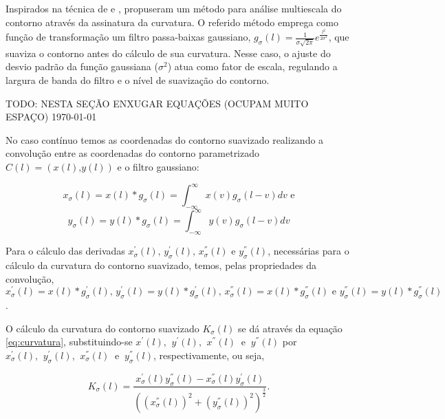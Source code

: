 Inspirados na técnica de  e ,  propuseram um método para análise multiescala do contorno através da assinatura da curvatura. O referido método emprega como função de transformação um filtro passa-baixas gaussiano, $g_{\sigma}(l) = \frac{1}{\sigma\sqrt{2\pi}}e^{\frac{l^2}{2\sigma^2}}$, que suaviza o contorno antes do cálculo de sua curvatura. Nesse caso, o ajuste do desvio padrão da função gaussiana ($\sigma^2$) atua como fator de escala, regulando a largura de banda do filtro e o nível de suavização do contorno.



\color{red}TODO: NESTA SEÇÃO ENXUGAR EQUAÇÕES (OCUPAM MUITO ESPAÇO) \today\color{black}


No caso contínuo temos as coordenadas do contorno suavizado realizando a convolução entre as coordenadas do contorno parametrizado $C(l) = (x(l)\text{,}y(l))$ e o filtro gaussiano:  

\begin{equation}
x_{\sigma}(l) = x(l) * g_{\sigma}(l) = \int^{\infty}_{-\infty}{x(v)g_{\sigma}(l-v)}dv \text{ e}
\end{equation}
\begin{equation}
y_{\sigma}(l) = y(l) * g_{\sigma}(l)=\int^{\infty}_{-\infty}{y(v)g_{\sigma}(l-v)}dv
\end{equation}

Para o cálculo das derivadas $x^{'}_{\sigma}(l)\text{, }y^{'}_{\sigma}(l)\text{, }x^{''}_{\sigma}(l) \text{ e }y^{''}_{\sigma}(l)$, necessárias para o cálculo da curvatura do contorno suavizado, temos, pelas propriedades da convolução, $x^{'}_{\sigma}(l) = x(l) * g^{'}_{\sigma}(l)\text{, }y^{'}_{\sigma}(l) = y(l) * g^{'}_{\sigma}(l)\text{, }x^{''}_{\sigma}(l) = x(l) * g^{''}_{\sigma}(l)\text{ e }
y^{''}_{\sigma}(l) = y(l) * g^{''}_{\sigma}(l)$.

O cálculo da curvatura do contorno suavizado $K_{\sigma}(l)$ se dá através da equação \ref{eq:curvatura}, substituindo-se $x^{'}(l)\text{, }\:y^{'}(l)\text{, }\:x^{''}(l)\:\text{ e }\:y^{''}(l)$ por $x^{'}_{\sigma}(l)\text{, }\:y^{'}_{\sigma}(l)\text{, }\:x^{''}_{\sigma}(l)\:\text{ e }\:y^{''}_{\sigma}(l)$, respectivamente, ou seja,

\begin{equation} \label{eq:curvatura_ms}
K_{\sigma}(l) = \frac{x_{\sigma}^{'}(l)y_{\sigma}^{''}(l)-x_{\sigma}^{''}(l)y_{\sigma}^{'}(l)}{((x_{\sigma}^{''}(l))^{2}+(y_{\sigma}^{''}(l))^{2})^{\frac{3}{2}}}\text{.}
\end{equation}

